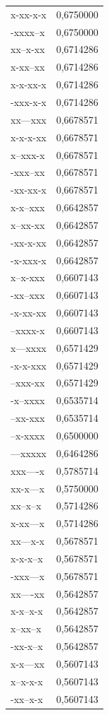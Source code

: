 \documentclass[
  letterpaper,
  DIV=11,
  numbers=noendperiod]{scrreprt}
\begin{document}
\begin{longtable*}{lr}
x-xx-x-x & 0,6750000 \\ 
-xxxx--x & 0,6750000 \\ 
xx--x-xx & 0,6714286 \\ 
x-xx--xx & 0,6714286 \\ 
x-x-xx-x & 0,6714286 \\ 
-xxx-x-x & 0,6714286 \\ 
xx---xxx & 0,6678571 \\ 
x-x-x-xx & 0,6678571 \\ 
x--xxx-x & 0,6678571 \\ 
-xxx--xx & 0,6678571 \\ 
-xx-xx-x & 0,6678571 \\ 
x-x--xxx & 0,6642857 \\ 
x--xx-xx & 0,6642857 \\ 
-xx-x-xx & 0,6642857 \\ 
-x-xxx-x & 0,6642857 \\ 
x--x-xxx & 0,6607143 \\ 
-xx--xxx & 0,6607143 \\ 
-x-xx-xx & 0,6607143 \\ 
--xxxx-x & 0,6607143 \\ 
x---xxxx & 0,6571429 \\ 
-x-x-xxx & 0,6571429 \\ 
--xxx-xx & 0,6571429 \\ 
-x--xxxx & 0,6535714 \\ 
--xx-xxx & 0,6535714 \\ 
--x-xxxx & 0,6500000 \\ 
---xxxxx & 0,6464286 \\ 
xxx----x & 0,5785714 \\ 
xx-x---x & 0,5750000 \\ 
xx--x--x & 0,5714286 \\ 
x-xx---x & 0,5714286 \\ 
xx---x-x & 0,5678571 \\ 
x-x-x--x & 0,5678571 \\ 
-xxx---x & 0,5678571 \\ 
xx----xx & 0,5642857 \\ 
x-x--x-x & 0,5642857 \\ 
x--xx--x & 0,5642857 \\ 
-xx-x--x & 0,5642857 \\ 
x-x---xx & 0,5607143 \\ 
x--x-x-x & 0,5607143 \\ 
-xx--x-x & 0,5607143 \\ 

\end{longtable*}
\end{document}
